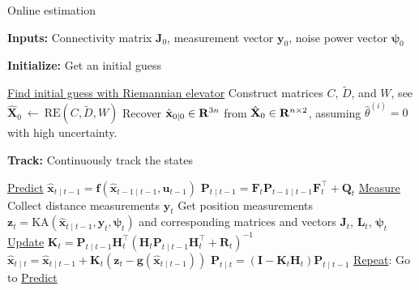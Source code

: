 \begin{algorithm}
    \caption{Online estimation}\label{algo:estimation}
    \textbf{Inputs:} Connectivity matrix $\mathbf{J}_0$, measurement vector $\mathbf{y}_0$, noise power vector $\bm{\psi}_0$
    
    \textbf{Initialize:} Get an initial guess
    \begingroup{} %
    \begin{algorithmic}[1]
        \Statex \underline{Find initial guess with Riemannian elevator}
        \State Construct matrices $C$, $\tilde{D}$, and $W$, see \cite{R_elevator}
        \State $\hat{\mathbf{X}}_0 \ \leftarrow\ \text{RE}(C, \tilde{D}, W)$
        \State Recover $\hat{\mathbf{x}}_{0 \mid 0} \in \mathbf{R}^{3n}$ from $\hat{\mathbf{X}}_0 \in \mathbf{R}^{n \times 2}$, assuming $\hat{\theta}^{(i)} = 0$ with high uncertainty.
    \end{algorithmic}

    \textbf{Track:} Continuously track the states
    \begin{algorithmic}[1]
        \Statex \underline{Predict}
        \State $\hat{\mathbf{x}}_{t \mid t-1} = \mathbf{f}(\hat{\mathbf{x}}_{t-1 \mid t-1}, \mathbf{u}_{t-1})$
        \State $\mathbf{P}_{t \mid t-1} = \mathbf{F}_t \mathbf{P}_{t-1 \mid t-1} \mathbf{F}_t^\top + \mathbf{Q}_t$
        \Statex \underline{Measure}
        \State Collect distance measurements $\mathbf{y}_t$
        \State Get position measurements $\mathbf{z}_t = \text{KA}(\hat{\mathbf{x}}_{t \mid t-1}, \mathbf{y}_t, \bm{\psi}_t)$ and corresponding matrices and vectors $\mathbf{J}_t$, $\mathbf{L}_t$, $\bm{\psi}_t$
        \Statex \underline{Update}
        \State $\mathbf{K}_t = \mathbf{P}_{t \mid t-1} \mathbf{H}^\top_t (\mathbf{H}_t \mathbf{P}_{t \mid t-1} \mathbf{H}_t^\top + \mathbf{R}_t)^{-1}$
        \State $\hat{\mathbf{x}}_{t \mid t} = \hat{\mathbf{x}}_{t\mid t-1} + \mathbf{K}_t (\mathbf{z}_t - \mathbf{g}(\hat{\mathbf{x}}_{t \mid t-1}))$
        \State $\mathbf{P}_{t \mid t} = (\mathbf{I} - \mathbf{K}_t \mathbf{H}_t) \mathbf{P}_{t \mid t-1}$
        \Statex \underline{Repeat}: Go to \underline{Predict}
    \end{algorithmic}
    \endgroup
\end{algorithm}